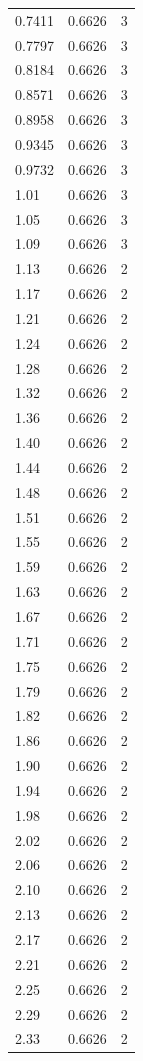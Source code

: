 \begin{longtable}{lrr}
  0.7411 & 0.6626 & 3 \\
  0.7797 & 0.6626 & 3 \\
  0.8184 & 0.6626 & 3 \\
  0.8571 & 0.6626 & 3 \\
  0.8958 & 0.6626 & 3 \\
  0.9345 & 0.6626 & 3 \\
  0.9732 & 0.6626 & 3 \\
  1.01 & 0.6626 & 3 \\
  1.05 & 0.6626 & 3 \\
  1.09 & 0.6626 & 3 \\
  1.13 & 0.6626 & 2 \\
  1.17 & 0.6626 & 2 \\
  1.21 & 0.6626 & 2 \\
  1.24 & 0.6626 & 2 \\
  1.28 & 0.6626 & 2 \\
  1.32 & 0.6626 & 2 \\
  1.36 & 0.6626 & 2 \\
  1.40 & 0.6626 & 2 \\
  1.44 & 0.6626 & 2 \\
  1.48 & 0.6626 & 2 \\
  1.51 & 0.6626 & 2 \\
  1.55 & 0.6626 & 2 \\
  1.59 & 0.6626 & 2 \\
  1.63 & 0.6626 & 2 \\
  1.67 & 0.6626 & 2 \\
  1.71 & 0.6626 & 2 \\
  1.75 & 0.6626 & 2 \\
  1.79 & 0.6626 & 2 \\
  1.82 & 0.6626 & 2 \\
  1.86 & 0.6626 & 2 \\
  1.90 & 0.6626 & 2 \\
  1.94 & 0.6626 & 2 \\
  1.98 & 0.6626 & 2 \\
  2.02 & 0.6626 & 2 \\
  2.06 & 0.6626 & 2 \\
  2.10 & 0.6626 & 2 \\
  2.13 & 0.6626 & 2 \\
  2.17 & 0.6626 & 2 \\
  2.21 & 0.6626 & 2 \\
  2.25 & 0.6626 & 2 \\
  2.29 & 0.6626 & 2 \\
  2.33 & 0.6626 & 2 \\

\end{longtable}
